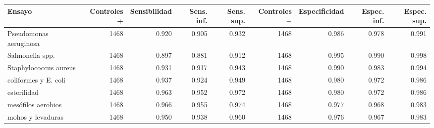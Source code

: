 \begin{tabular}{lrrrrrrrr}
\toprule
Ensayo & Controles + & Sensibilidad & Sens. inf. & Sens. sup. & Controles $-$ & Especificidad & Espec. inf. & Espec. sup. \\
\midrule
Pseudomonas aeruginosa & 1468 & 0.920 & 0.905 & 0.932 & 1468 & 0.986 & 0.978 & 0.991 \\
Salmonella spp. & 1468 & 0.897 & 0.881 & 0.912 & 1468 & 0.995 & 0.990 & 0.998 \\
Staphylococcus aureus & 1468 & 0.931 & 0.917 & 0.943 & 1468 & 0.990 & 0.983 & 0.994 \\
coliformes y E. coli & 1468 & 0.937 & 0.924 & 0.949 & 1468 & 0.980 & 0.972 & 0.986 \\
esterilidad & 1468 & 0.963 & 0.952 & 0.972 & 1468 & 0.980 & 0.972 & 0.986 \\
mesófilos aerobios & 1468 & 0.966 & 0.955 & 0.974 & 1468 & 0.977 & 0.968 & 0.983 \\
mohos y levaduras & 1468 & 0.950 & 0.938 & 0.960 & 1468 & 0.976 & 0.967 & 0.983 \\
\bottomrule
\end{tabular}
